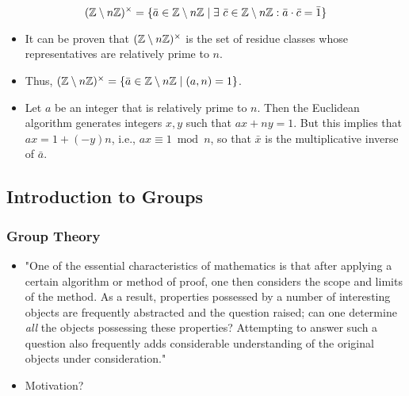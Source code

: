 \documentclass[../main.tex]{subfiles}
\begin{document}
\begin{itemize}
    \begin{equation*}
        (\mathbb{Z}\setminus n\mathbb{Z})^\times = \{\bar{a}\in\mathbb{Z}\setminus n\mathbb{Z}\mid \exists\ \bar{c}\in\mathbb{Z}\setminus n\mathbb{Z}:\bar{a}\cdot\bar{c}=\bar{1}\}
    \end{equation*}
    \begin{itemize}
        \item It can be proven that $(\mathbb{Z}\setminus n\mathbb{Z})^\times$ is the set of residue classes whose representatives are relatively prime to $n$.
        \item Thus, $(\mathbb{Z}\setminus n\mathbb{Z})^\times=\{\bar{a}\in\mathbb{Z}\setminus n\mathbb{Z}\mid(a,n)=1\}$.
        \item Let $a$ be an integer that is relatively prime to $n$. Then the Euclidean algorithm generates integers $x,y$ such that $ax+ny=1$. But this implies that $ax=1+(-y)n$, i.e., $ax\equiv 1\bmod n$, so that $\bar{x}$ is the multiplicative inverse of $\bar{a}$.
    \end{itemize}
\end{itemize}


\subsection{Introduction to Groups}
\subsubsection{Group Theory}
\begin{itemize}
    \item "One of the essential characteristics of mathematics is that after applying a certain algorithm or method of proof, one then considers the scope and limits of the method. As a result, properties possessed by a number of interesting objects are frequently abstracted and the question raised; can one determine \emph{all} the objects possessing these properties? Attempting to answer such a question also frequently adds considerable understanding of the original objects under consideration."
    \item Motivation?
\end{itemize}
\end{document}
